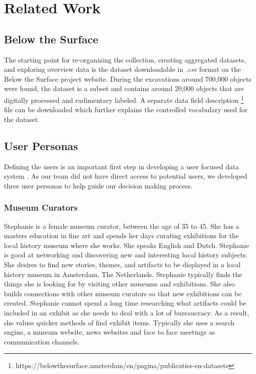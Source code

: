\section{Related Work}

\subsection{Below the Surface}

The starting point for re-organizing the collection, creating aggregated datasets, and exploring overview data is the dataset downloadable in \textit{.csv} format on the Below the Surface project website. During the excavations around 700,000 objects were found, the dataset is a subset and contains around 20,000 objects that are digitally processed and rudimentary labeled. A separate data field description \footnote{https://belowthesurface.amsterdam/en/pagina/publicaties-en-datasets} file can be downloaded which further explains the controlled vocabulary used for the dataset.

\subsection{User Personas}

Defining the users is an important first step in developing a user focused data system \cite{Just-RightPersonas}.  As our team did not have direct access to potential users, we developed three user personas to help guide our decision making process.  

\subsubsection{Museum Curators}

Stephanie is a female museum curator, between the age of 35 to 45.  She has a masters education in fine art and spends her days curating exhibitions for the local history museum where she works.  She speaks English and Dutch.  Stephanie is good at networking and discovering new and interesting local history subjects.  She desires to find new stories, themes, and artifacts to be displayed in a local history museum in Amsterdam, The Netherlands.  Stephanie typically finds the things she is looking for by visiting other museums and exhibitions.  She also builds connections with other museum curators so that new exhibitions can be created.  Stephanie cannot spend a long time researching what artifacts could be included in an exhibit as she needs to deal with a lot of bureaucracy. As a result, she values quicker methods of find exhibit items.  Typically she uses a search engine, a museum website, news websites and face to face meetings as communication channels.

